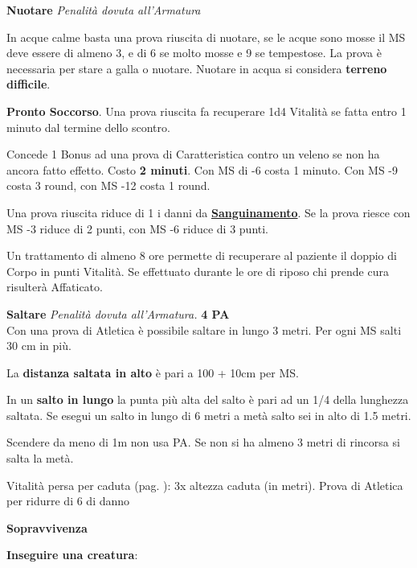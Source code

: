 \documentclass[12pt,a4paper,twoside,openany]{book}
\begin{document}
\begin{multicols}{2}
\medskip

\textbf{Nuotare} \textit{Penalità dovuta all'Armatura}

In acque calme basta una prova riuscita di nuotare, se le acque sono mosse il MS deve essere di almeno 3, e di 6 se molto mosse e 9 se tempestose. La prova è necessaria per stare a galla o nuotare. Nuotare in acqua si considera \textbf{terreno difficile}.

\medskip

\textbf{Pronto Soccorso}\hypertarget{prontosoccorso}{}\label{prontosoccorso}. Una prova riuscita fa recuperare 1d4 Vitalità se fatta entro 1 minuto dal termine dello scontro.

Concede 1 Bonus ad una prova di Caratteristica contro un veleno se non ha ancora fatto effetto. Costo \textbf{2 minuti}. Con MS di -6 costa 1 minuto. Con MS -9 costa 3 round, con MS -12 costa 1 round.

Una prova riuscita riduce di 1 i danni da \hyperlink{sanguinamento}{\textbf{Sanguinamento}}. Se la prova riesce con MS -3 riduce di 2 punti, con MS -6 riduce di 3 punti.

Un trattamento di almeno 8 ore permette di recuperare al paziente il doppio di Corpo in punti Vitalità. Se effettuato durante le ore di riposo chi prende cura risulterà Affaticato.

\medskip

\textbf{Saltare} \textit{Penalità dovuta all'Armatura.} \textbf{4 PA}\\

Con una prova di Atletica è possibile saltare in lungo 3 metri. Per ogni MS salti 30 cm in più.

La \textbf{distanza saltata in alto} è pari a 100 + 10cm per MS.

In un \textbf{salto in lungo} la punta più alta del salto è pari ad un 1/4 della lunghezza saltata. Se esegui un salto in lungo di 6 metri a metà salto sei in alto di 1.5 metri.

Scendere da meno di 1m non usa PA. Se non si ha almeno 3 metri di rincorsa si salta la metà.

Vitalità persa per caduta (pag. \pageref{cadute}): 3x altezza caduta (in metri). Prova di Atletica per ridurre di 6 di danno

\medskip

\textbf{Sopravvivenza}

\smallskip

\textbf{Inseguire una creatura}:


\end{multicols}
\end{document}

